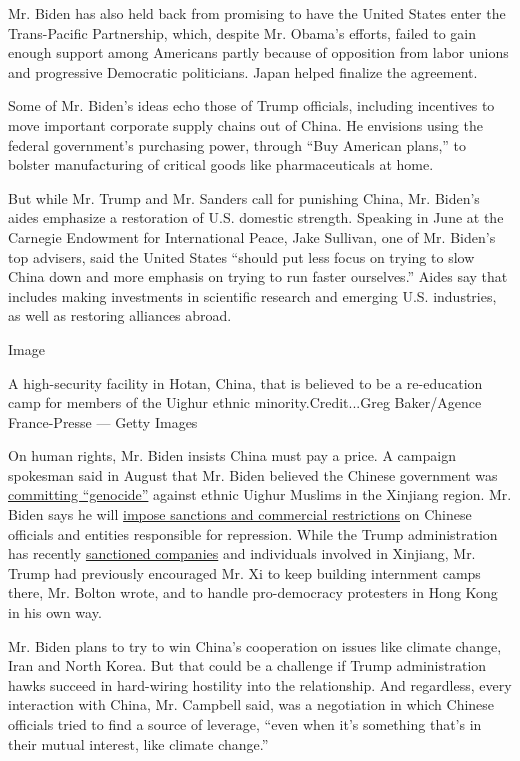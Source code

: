 Mr. Biden has also held back from promising to have the United States
enter the Trans-Pacific Partnership, which, despite Mr. Obama's efforts,
failed to gain enough support among Americans partly because of
opposition from labor unions and progressive Democratic politicians.
Japan helped finalize the agreement.

Some of Mr. Biden's ideas echo those of Trump officials, including
incentives to move important corporate supply chains out of China. He
envisions using the federal government's purchasing power, through ``Buy
American plans,'' to bolster manufacturing of critical goods like
pharmaceuticals at home.

But while Mr. Trump and Mr. Sanders call for punishing China, Mr.
Biden's aides emphasize a restoration of U.S. domestic strength.
Speaking in June at the Carnegie Endowment for International Peace, Jake
Sullivan, one of Mr. Biden's top advisers, said the United States
``should put less focus on trying to slow China down and more emphasis
on trying to run faster ourselves.'' Aides say that includes making
investments in scientific research and emerging U.S. industries, as well
as restoring alliances abroad.

Image

A high-security facility in Hotan, China, that is believed to be a
re-education camp for members of the Uighur ethnic
minority.Credit...Greg Baker/Agence France-Presse --- Getty Images

On human rights, Mr. Biden insists China must pay a price. A campaign
spokesman said in August that Mr. Biden believed the Chinese government
was
\href{https://www.politico.com/news/2020/08/25/trump-administration-china-genocide-uighurs-401581}{committing
``genocide''} against ethnic Uighur Muslims in the Xinjiang region. Mr.
Biden says he will
\href{https://twitter.com/elyratner/status/1278458007811248130}{impose
sanctions and commercial restrictions} on Chinese officials and entities
responsible for repression. While the Trump administration has recently
\href{https://www.nytimes3xbfgragh.onion/2020/07/20/business/economy/china-sanctions-uighurs-labor.html}{sanctioned
companies} and individuals involved in Xinjiang, Mr. Trump had
previously encouraged Mr. Xi to keep building internment camps there,
Mr. Bolton wrote, and to handle pro-democracy protesters in Hong Kong in
his own way.

Mr. Biden plans to try to win China's cooperation on issues like climate
change, Iran and North Korea. But that could be a challenge if Trump
administration hawks succeed in hard-wiring hostility into the
relationship. And regardless, every interaction with China, Mr. Campbell
said, was a negotiation in which Chinese officials tried to find a
source of leverage, ``even when it's something that's in their mutual
interest, like climate change.''

